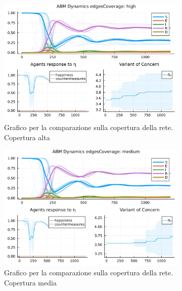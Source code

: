 \begin{figure}[!hb]
	\centering
	\begin{subfigure}[b]{0.3\textwidth}
		\centering
		\includegraphics[width=\textwidth]{img/SocialNetworkABM_1_EC.jpg}
		\caption{Grafico per la comparazione sulla copertura della rete. Copertura alta}
		\label{fig:comparison_highCoverage}
	\end{subfigure}
	\hfill
	\begin{subfigure}[b]{0.3\textwidth}
		\centering
		\includegraphics[width=\textwidth]{img/SocialNetworkABM_2_EC.jpg}
		\caption{Grafico per la comparazione sulla copertura della rete. Copertura media}
		\label{fig:comparison_mediumCoverage}
	\end{subfigure}
	\hfill
	\begin{subfigure}[b]{0.3\textwidth}
		\centering

\end{subfigure}
\end{figure}
